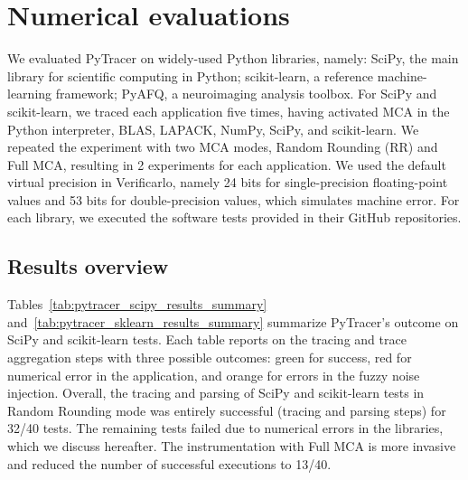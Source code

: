 \documentclass[11pt]{article}
\newcommand{\pytracer}[0]{PyTracer\xspace}
\begin{document}
\section{Numerical evaluations}

We evaluated \pytracer on widely-used Python libraries, namely: SciPy, the main library for scientific computing in Python; scikit-learn, a reference machine-learning framework; PyAFQ, a neuroimaging analysis toolbox.
For SciPy and scikit-learn, we traced each application five times, having activated MCA in the Python interpreter, BLAS, LAPACK, NumPy, SciPy, and scikit-learn. We repeated the experiment with two MCA modes, Random Rounding (RR) and Full MCA, resulting in 2 experiments for each application. We used the default virtual precision in Verificarlo, namely 24 bits for single-precision floating-point values and 53 bits for double-precision values, which simulates machine error. For each library, we executed the software tests provided in their GitHub repositories.

\subsection{Results overview}

Tables~\ref{tab:pytracer_scipy_results_summary} and~\ref{tab:pytracer_sklearn_results_summary} summarize 
\pytracer's outcome on SciPy and scikit-learn tests.
Each table reports on the tracing and trace aggregation steps with three possible outcomes: green for success, red for numerical error in the application, and orange for errors in the fuzzy noise injection. Overall, the tracing and parsing of SciPy and scikit-learn tests in Random Rounding mode was entirely successful (tracing and parsing steps) for 32/40 tests. The remaining tests failed due to numerical errors in the libraries, which we discuss hereafter. The instrumentation with Full MCA is more invasive and reduced the number of successful executions to 13/40.
\end{document}

